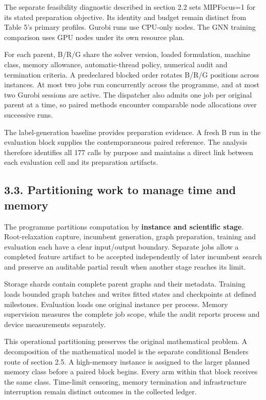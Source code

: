 \documentclass[
  british,
  10pt,
]{article}
\begin{document}
The separate feasibility diagnostic described in section 2.2 sets
MIPFocus=1 for its stated preparation objective. Its identity and budget
remain distinct from Table 5's primary profiles. Gurobi runs use
CPU-only nodes. The GNN training comparison uses GPU nodes under its own
resource plan.

For each parent, B/R/G share the solver version, loaded formulation,
machine class, memory allowance, automatic-thread policy, numerical
audit and termination criteria. A predeclared blocked order rotates
B/R/G positions across instances. At most two jobs run concurrently
across the programme, and at most two Gurobi sessions are active. The
dispatcher also admits one job per original parent at a time, so paired
methods encounter comparable node allocations over successive runs.

The label-generation baseline provides preparation evidence. A fresh B
run in the evaluation block supplies the contemporaneous paired
reference. The analysis therefore identifies all 177 calls by purpose
and maintains a direct link between each evaluation cell and its
preparation artifacts.

\subsection{3.3. Partitioning work to manage time and
memory}\label{partitioning-work-to-manage-time-and-memory}

The programme partitions computation by \textbf{instance and scientific
stage}. Root-relaxation capture, incumbent generation, graph
preparation, training and evaluation each have a clear input/output
boundary. Separate jobs allow a completed feature artifact to be
accepted independently of later incumbent search and preserve an
auditable partial result when another stage reaches its limit.

Storage shards contain complete parent graphs and their metadata.
Training loads bounded graph batches and writes fitted states and
checkpoints at defined milestones. Evaluation loads one original
instance per process. Memory supervision measures the complete job
scope, while the audit reports process and device measurements
separately.

This operational partitioning preserves the original mathematical
problem. A decomposition of the mathematical model is the separate
conditional Benders route of section 2.5. A high-memory instance is
assigned to the larger planned memory class before a paired block
begins. Every arm within that block receives the same class. Time-limit
censoring, memory termination and infrastructure interruption remain
distinct outcomes in the collected ledger.
\end{document}
